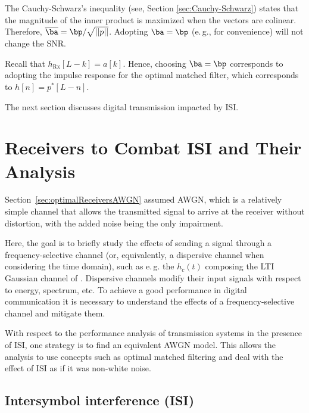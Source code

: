 The Cauchy-Schwarz's inequality (see, Section \ref{sec:Cauchy-Schwarz}) states that the magnitude of the inner product is maximized when the vectors are colinear. Therefore, $\overline \ba = \bp / \sqrt{||p||}$. Adopting $\ba=\bp$ (e.\,g., for convenience) will not change the SNR.


Recall that $h_\textrm{Rx}[L-k] = a[k]$. Hence, choosing $\ba=\bp$ corresponds to adopting the impulse response  for the optimal matched filter, which corresponds to $h[n]=p^*[L-n]$.


The next section discusses digital transmission impacted by ISI.

\section{Receivers to Combat ISI and Their Analysis}
\label{sec:nyquistZeroISI}

Section~\ref{sec:optimalReceiversAWGN} assumed AWGN, which is a relatively simple channel that allows the transmitted signal to arrive at the receiver without distortion,
with the added noise being the only impairment. 

Here, 
the goal is to briefly study the effects of sending a signal through a frequency-selective
channel (or, equivalently, a dispersive channel when considering the time domain), such as e.\,g. the $h_c(t)$ composing the LTI Gaussian channel of .
Dispersive channels modify their input signals with respect to energy, spectrum, etc. 
To achieve a good performance in digital communication it is necessary to understand
the effects of a frequency-selective channel and mitigate them. 

With respect to the performance analysis of transmission systems in the presence of ISI, 
one strategy is to find an equivalent AWGN model. This allows the analysis to use concepts
such as optimal matched filtering and deal with the effect of ISI as if it was non-white
noise.

\subsection{Intersymbol interference (ISI)}

